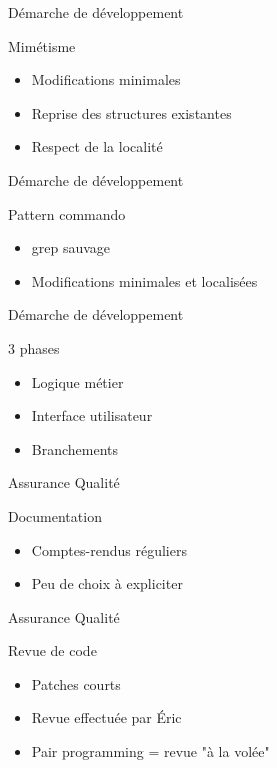 \documentclass[handout]{beamer}
\begin{document}
\begin{frame}{Démarche de développement}
    \begin{block}{Mimétisme}
        \begin{itemize}[<+->]
            \item Modifications minimales
            \item Reprise des structures existantes 
            \item Respect de la localité
        \end{itemize}
    \end{block}
\end{frame}

\begin{frame}{Démarche de développement}
    \begin{block}{Pattern commando}
        \begin{itemize}[<+->]
            \item grep sauvage
            \item Modifications minimales et localisées
        \end{itemize}
    \end{block}
\end{frame}

\begin{frame}{Démarche de développement}
    \begin{block}{3 phases}
        \begin{itemize}[<+->]
            \item Logique métier
            \item Interface utilisateur
            \item Branchements
        \end{itemize}
    \end{block}
\end{frame}

\begin{frame}{Assurance Qualité}
    \begin{block}{Documentation}
        \begin{itemize}[<+->]
            \item Comptes-rendus réguliers
            \item Peu de choix à expliciter
        \end{itemize}
    \end{block}
\end{frame}

\begin{frame}{Assurance Qualité}
    \begin{block}{Revue de code}
        \begin{itemize}[<+->]
            \item Patches courts
            \item Revue effectuée par Éric
            \item Pair programming = revue "à la volée"
        \end{itemize}
    \end{block}
\end{frame}
\end{document}
